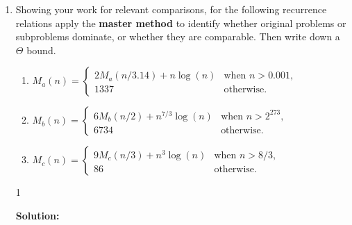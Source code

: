 \documentclass[9pt]{article}
\def\solutions{1}
\begin{document}
\begin{enumerate}
\item Showing your work for relevant comparisons, for the following recurrence relations apply the \textbf{master method} to identify whether original problems or subproblems dominate, or whether they are comparable.  Then write down a $\Theta$ bound.
  \begin{enumerate}
  \item $M_a(n) = \begin{cases}
    2M_a(n/3.14) + n\log(n) & \text{when } n > 0.001, \\
    1337 & \text{otherwise.}
  \end{cases}$
  \item $M_b(n) = \begin{cases}
    6M_b(n/2) + n^{7/3}\log(n) & \text{when } n > 2^{273}, \\
    6734 & \text{otherwise.}
  \end{cases}$
  \item $M_c(n) = \begin{cases}
    9M_c(n/3) + n^3\log(n) & \text{when } n > 8/3, \\
    86 & \text{otherwise.}
    \end{cases}$
  \end{enumerate}

\if\solutions1
\vspace{2mm}

\textbf{Solution:} \\


\fi

\newpage

\vspace{5mm}


\end{enumerate}
\end{document}
